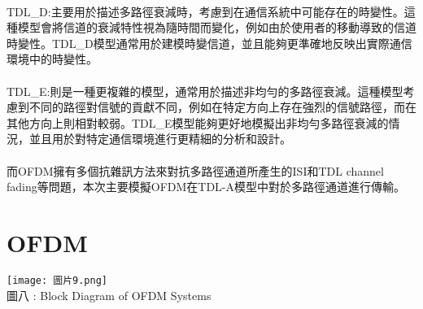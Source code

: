 \documentclass[12pt,a4paper]{article} %
\begin{document}
\\
TDL\_D:主要用於描述多路徑衰減時，考慮到在通信系統中可能存在的時變性。這種模型會將信道的衰減特性視為隨時間而變化，例如由於使用者的移動導致的信道時變性。TDL\_D模型通常用於建模時變信道，並且能夠更準確地反映出實際通信環境中的時變性。\\
\\
TDL\_E:則是一種更複雜的模型，通常用於描述非均勻的多路徑衰減。這種模型考慮到不同的路徑對信號的貢獻不同，例如在特定方向上存在強烈的信號路徑，而在其他方向上則相對較弱。TDL\_E模型能夠更好地模擬出非均勻多路徑衰減的情況，並且用於對特定通信環境進行更精細的分析和設計。\\
\\
而OFDM擁有多個抗雜訊方法來對抗多路徑通道所產生的ISI和TDL channel fading等問題，本次主要模擬OFDM在TDL-A模型中對於多路徑通道進行傳輸。
\section{OFDM}
\texttt{[image: 圖片9.png]}\\
圖八 : Block Diagram of OFDM Systems\cite{Readme_Matlab_Platform}\\
\end{document}
